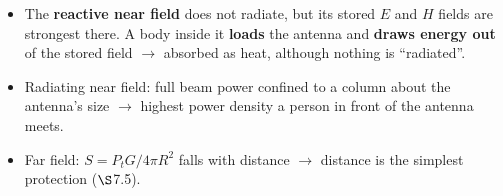 \par{}
\begin{itemize}
  \item The \textbf{reactive near field} does not radiate, but its stored $E$ and $H$ fields
    are strongest there. A body inside it \textbf{loads} the antenna and \textbf{draws energy
    out} of the stored field $\rightarrow$ absorbed as heat, although nothing is ``radiated''.
  \item Radiating near field: full beam power confined to a column about the antenna's size
    $\rightarrow$ highest power density a person in front of the antenna meets.
  \item Far field: $S = P_tG/4\pi R^2$ falls with distance $\rightarrow$ distance is the
    simplest protection ($\S$7.5).
\end{itemize}

